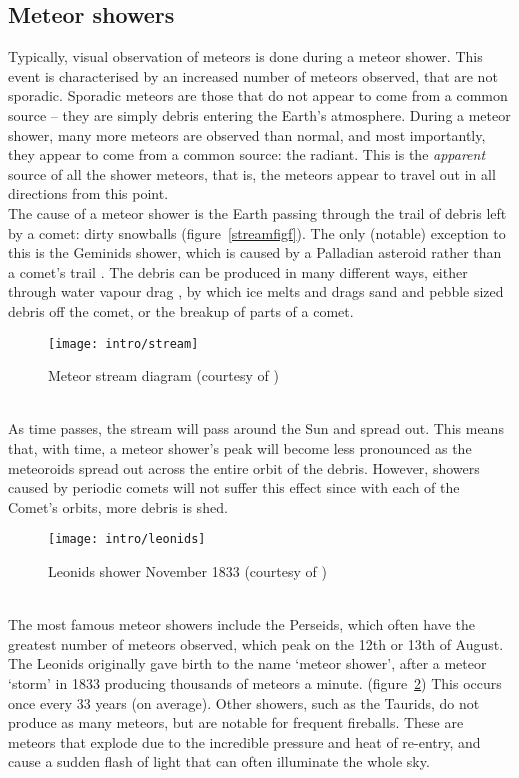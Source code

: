 \subsection{Meteor showers}
Typically, visual observation of meteors is done during a meteor shower. This event is characterised by an increased number of meteors observed, that are not sporadic. Sporadic meteors are those that do not appear to come from a common source -- they are simply debris entering the Earth's atmosphere. During a meteor shower, many more meteors are observed than normal, and most importantly, they appear to come from a common source: the radiant. This is the {\it apparent} source of all the shower meteors, that is, the meteors appear to travel out in all directions from this point.\\
The cause of a meteor shower is the Earth passing through the trail of debris left by a comet: dirty snowballs (figure~\ref{streamfigf}). The only (notable) exception to this is the Geminids shower, which is caused by a Palladian asteroid rather than a comet's trail \cite{palladian}. The debris can be produced in many different ways, either through water vapour drag \cite{watervapour}, by which ice melts and drags sand and pebble sized debris off the comet, or the breakup of parts of a comet.\\
\begin{figure}[h!]
	\centering
	\texttt{[image: intro/stream]}
	\caption{Meteor stream diagram (courtesy of \cite{stream})
	\label{streamfig}}
\end{figure}\\
As time passes, the stream will pass around the Sun and spread out. This means that, with time, a meteor shower's peak will become less pronounced as the meteoroids spread out across the entire orbit of the debris. However, showers caused by periodic comets will not suffer this effect since with each of the Comet's orbits, more debris is shed.\\
\begin{figure}
	\centering
	\texttt{[image: intro/leonids]}
	\caption{Leonids shower November 1833 (courtesy of \cite{leonids}) 
		\label{fig:1833leonids}}
\end{figure}\\
The most famous meteor showers include the Perseids, which often have the greatest number of meteors observed, which peak on the 12th or 13th of August. The Leonids originally gave birth to the name `meteor shower',  after a meteor `storm' in 1833 producing thousands of meteors a minute. (figure~\ref{fig:1833leonids}) This occurs once every 33 years (on average). Other showers, such as the Taurids, do not produce as many meteors, but are notable for frequent fireballs. These are meteors that explode due to the incredible pressure and heat of re-entry, and cause a sudden flash of light that can often illuminate the whole sky.


